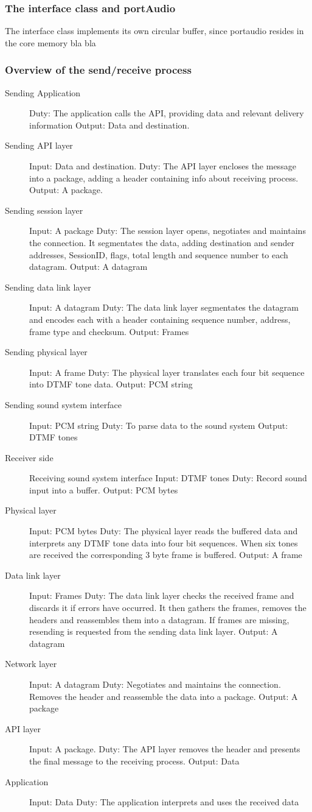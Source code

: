 \subsubsection{The interface class and portAudio}
The interface class implements its own circular buffer, since portaudio resides in the core memory bla bla


\subsubsection{Overview of the send/receive process}
\begin{description}
\item[Sending Application]
Duty: The application calls the API, providing data and relevant delivery information
Output: Data and destination.
\item[Sending API layer]
Input: Data and destination.
Duty: The API layer encloses the message into a package, adding a header containing info about receiving process.
Output: A package.
\item[Sending session layer]
Input: A package
Duty: The session layer opens, negotiates and maintains the connection. It segmentates the data, adding destination and sender addresses, SessionID, flags, total length and sequence number to each datagram.
Output: A datagram
\item[Sending data link layer]
Input: A datagram
Duty: The data link layer segmentates the datagram and encodes each with a header containing sequence number, address, frame type and checksum.
Output: Frames
\item[Sending physical layer]
Input: A frame
Duty: The physical layer translates each four bit sequence into DTMF tone data.
Output: PCM string
\item[Sending sound system interface]
Input: PCM string
Duty: To parse data to the sound system
Output: DTMF tones
\item[Receiver side]
Receiving sound system interface
Input: DTMF tones
Duty: Record sound input into a buffer.
Output: PCM bytes
\item[Physical layer]
Input: PCM bytes
Duty: The physical layer reads the buffered data and interprets any DTMF tone data into four bit sequences. When six tones are received the corresponding 3 byte frame is buffered.
Output: A frame
\item[Data link layer]
Input: Frames
Duty: The data link layer checks the received frame and discards it if errors have occurred. It then gathers the frames, removes the headers and reassembles them into a datagram. If frames are missing, resending is requested from the sending data link layer.
Output: A datagram
\item[Network layer]
Input: A datagram
Duty: Negotiates and maintains the connection. Removes the header and reassemble the data into a package.
Output: A package
\item[API layer]
Input: A package.
Duty: The API layer removes the header and presents the final message to the receiving process.
Output: Data
\item[Application]
Input: Data
Duty: The application interprets and uses the received data
\end{description}